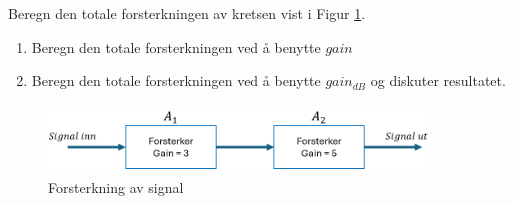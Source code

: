 \begin{question}[name=Oppgave, topic=forsterkning]
Beregn den totale forsterkningen av kretsen vist i Figur \ref{fig:forsterk1}.
	\begin{enumerate}[label=\roman*)]
	\item Beregn den totale forsterkningen ved å benytte $gain$
	\item Beregn den totale forsterkningen ved å benytte $gain_{dB}$ og diskuter resultatet.
	\end{enumerate}

	\begin{figure}[H]
	\centering
	\includegraphics[width=0.9\textwidth]{forsterkning/figurer/forsterkning1.png}
	\caption{Forsterkning av signal}
	\label{fig:forsterk1}
\end{figure}
\end{question}

\vspace{0.5cm} %

